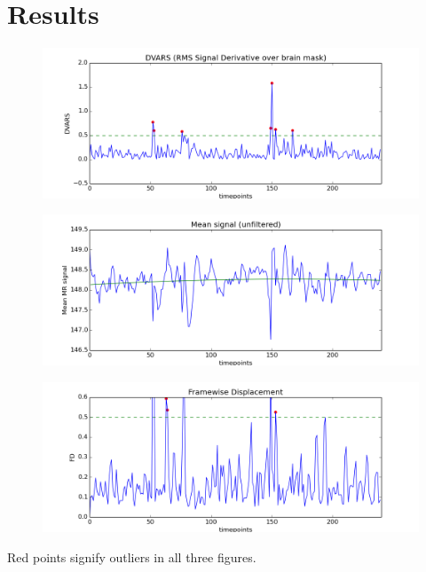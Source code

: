 \section{Results}

\begin{figure}[H]
    \centering
        \includegraphics[scale=0.5]{figures/dvars_sub9run1.png}
\end{figure}

\begin{figure}[H]
    \centering
        \includegraphics[scale=0.5]{figures/mean_sub9run1.png}
\end{figure}    

\begin{figure}[H]
    \centering
        \includegraphics[scale = 0.5]{figures/fd_sub9run1.png}
\end{figure}

\begin{center}
    Red points signify outliers in all three figures.
\end{center}

